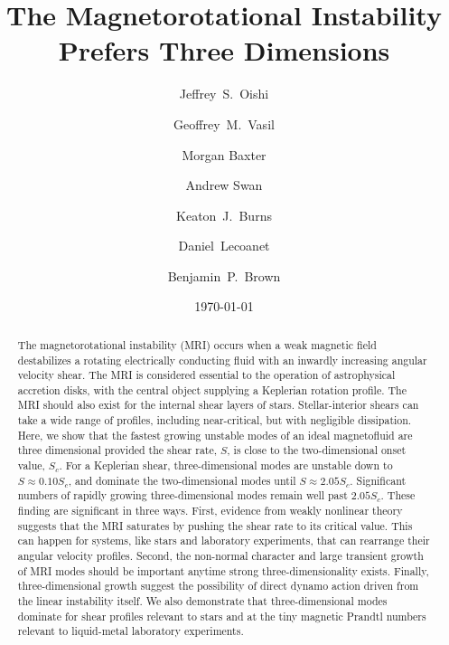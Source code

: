 \documentclass[aps,prl,reprint,superscriptaddress]{revtex4-1}
\begin{document}
\title{The Magnetorotational Instability Prefers Three Dimensions}

\author{Jeffrey~S.~Oishi}

\author{Geoffrey~M.~Vasil}
\author{Morgan Baxter}
\author{Andrew Swan}
\author{Keaton~J.~Burns}
\author{Daniel~Lecoanet}
\author{Benjamin~P.~Brown}

\date{\today}

\begin{abstract}
The magnetorotational instability (MRI) occurs when a weak magnetic field destabilizes a rotating electrically conducting fluid with an inwardly increasing angular velocity shear.
The MRI is considered essential to the operation of astrophysical accretion disks, with the central object supplying a Keplerian rotation profile.
The MRI should also exist for the internal shear layers of stars.
Stellar-interior shears can take a wide range of profiles, including near-critical, but with negligible dissipation. 
Here, we show that the fastest growing unstable modes of an ideal magnetofluid are three dimensional provided the shear rate, $S$, is close to the two-dimensional onset value, $S_c$.
For a Keplerian shear, three-dimensional modes are unstable down to $S\approx0.10S_c$, and dominate the two-dimensional modes until $S\approx2.05S_{c}$.
Significant numbers of rapidly growing three-dimensional modes remain well past $2.05S_{c}$. 
These finding are significant in three ways. 
First, evidence from weakly nonlinear theory suggests that the MRI saturates by pushing the shear rate to its critical value. 
This can happen for systems, like stars and laboratory experiments, that can rearrange their angular velocity profiles.
Second, the non-normal character and large transient growth of MRI modes should be important anytime strong three-dimensionality exists.
Finally, three-dimensional growth suggest the possibility of direct dynamo action driven from the linear instability itself.
We also demonstrate that three-dimensional modes dominate for shear profiles relevant to stars and at the tiny magnetic Prandtl numbers relevant to liquid-metal laboratory experiments.
\end{abstract}
\end{document}
